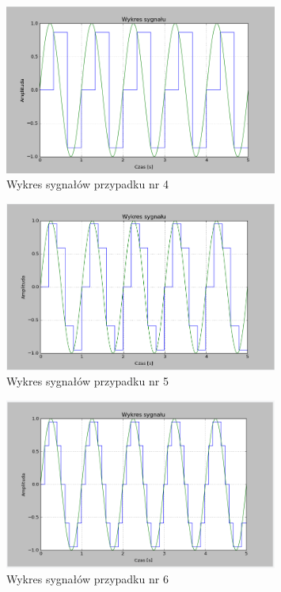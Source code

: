 \documentclass{article}
\begin{document}
    \begin{figure}[h!]
        \centering
        \includegraphics[width=0.8\textwidth]{img/1/zoh3.png}
        \caption{Wykres sygnałów przypadku nr 4}
    \end{figure}
    \FloatBarrier

    \begin{figure}[h!]
        \centering
        \includegraphics[width=0.8\textwidth]{img/1/zoh5.png}
        \caption{Wykres sygnałów przypadku nr 5}
    \end{figure}
    \FloatBarrier

    \begin{figure}[h!]
        \centering
        \includegraphics[width=0.8\textwidth]{img/1/zho10.png}
        \caption{Wykres sygnałów przypadku nr 6}
    \end{figure}
    \FloatBarrier
\end{document}
